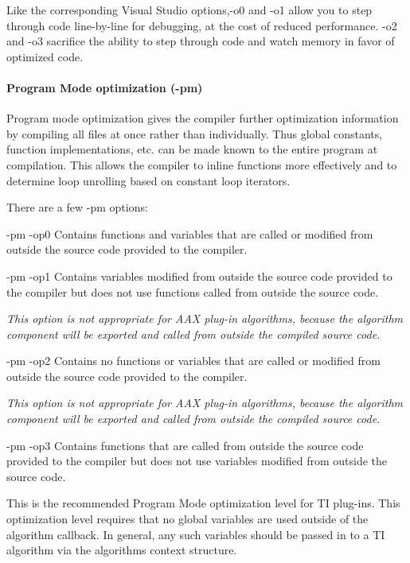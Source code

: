 Like the corresponding Visual Studio options,{\ttfamily -\/o0} and {\ttfamily -\/o1} allow you to step through code line-\/by-\/line for debugging, at the cost of reduced performance. {\ttfamily -\/o2} and {\ttfamily -\/o3} sacrifice the ability to step through code and watch memory in favor of optimized code.

\hypertarget{a00362_subsubsection__program_mode_optimization_pm_}{}\paragraph{Program Mode optimization (-\/pm)}\label{a00362_subsubsection__program_mode_optimization_pm_}
 Program mode optimization gives the compiler further optimization information by compiling all files at once rather than individually. Thus global constants, function implementations, etc. can be made known to the entire program at compilation. This allows the compiler to inline functions more effectively and to determine loop unrolling based on constant loop iterators.

There are a few {\ttfamily -\/pm} options\+:


\begin{DoxyItemize}
\item {\ttfamily -\/pm -\/op0}  Contains functions and variables that are called or modified from outside the source code provided to the compiler.  


\item {\ttfamily -\/pm -\/op1}  Contains variables modified from outside the source code provided to the compiler but does not use functions called from outside the source code. 

 {\itshape  This option is not appropriate for A\+A\+X plug-\/in algorithms, because the algorithm component will be exported and called from outside the compiled source code.}  


\item {\ttfamily -\/pm -\/op2}  Contains no functions or variables that are called or modified from outside the source code provided to the compiler. 

 {\itshape  This option is not appropriate for A\+A\+X plug-\/in algorithms, because the algorithm component will be exported and called from outside the compiled source code.}  


\item {\ttfamily -\/pm -\/op3}  Contains functions that are called from outside the source code provided to the compiler but does not use variables modified from outside the source code.  

 This is the recommended Program Mode optimization level for T\+I plug-\/ins. This optimization level requires that no global variables are used outside of the algorithm callback. In general, any such variables should be passed in to a T\+I algorithm via the algorithm\textquotesingle{}s context structure.  
\end{DoxyItemize}

